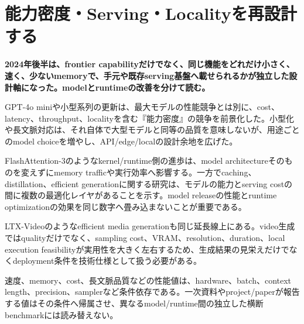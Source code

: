 \section{能力密度・Serving・Localityを再設計する}
\noindent\textbf{2024年後半は、frontier capabilityだけでなく、同じ機能をどれだけ小さく、速く、少ないmemoryで、手元や既存serving基盤へ載せられるかが独立した設計軸になった。modelとruntimeの改善を分けて読む。}\autocite{src-031c86eaad2b,src-3aa7f9dab810}

GPT-4o miniや小型系列の更新は、最大モデルの性能競争とは別に、cost、latency、throughput、localityを含む『能力密度』の競争を前景化した。小型化や長文脈対応は、それ自体で大型モデルと同等の品質を意味しないが、用途ごとのmodel choiceを増やし、API/edge/localの設計余地を広げた。\autocite{src-031c86eaad2b,src-ec05e05a8071,src-f086061a9e86}


FlashAttention-3のようなkernel/runtime側の進歩は、model architectureそのものを変えずにmemory trafficや実行効率へ影響する。一方でcaching、distillation、efficient generationに関する研究は、モデルの能力とserving costの間に複数の最適化レイヤがあることを示す。model releaseの性能とruntime optimizationの効果を同じ数字へ畳み込まないことが重要である。\autocite{src-3aa7f9dab810,src-ecac5d71389f,src-ee43656ed6da,src-fc4f100c5e5a}


LTX-Videoのようなefficient media generationも同じ延長線上にある。video生成ではqualityだけでなく、sampling cost、VRAM、resolution、duration、local execution feasibilityが実用性を大きく左右するため、生成結果の見栄えだけでなくdeployment条件を技術仕様として扱う必要がある。\autocite{src-fd5d0edaf394}


\begin{claimboundary}
速度、memory、cost、長文脈品質などの性能値は、hardware、batch、context length、precision、samplerなど条件依存である。一次資料やproject/paperが報告する値はその条件へ帰属させ、異なるmodel/runtime間の独立した横断benchmarkには読み替えない。\autocite{src-3aa7f9dab810}
\end{claimboundary}

